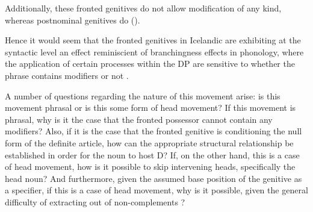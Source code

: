 \documentclass[output=paper]{langscibook}
\begin{document}
Additionally, these fronted genitives do not allow modification of any kind, whereas postnominal genitives do (\citealt{Magnusson:1984ue, OConnor:2013wz}). 

\begin{exe}
	\ex	\citet[101]{Magnusson:1984ue} \label{hardarsoncommons}\vspace{-0.75\baselineskip}
		\begin{xlist}
		\setlength{\columnsep}{-40pt}
		\begin{multicols}{2}
			 \columnbreak
		\end{multicols}
		\end{xlist}
\end{exe}

\noindent Hence it would seem that the fronted genitives in Icelandic are exhibiting at the syntactic level an effect reminiscient of branchingness effects in phonology, where the application of certain processes within the DP are sensitive to whether the phrase contains modifiers or not \citep[for an overview, see, e.g.,][]{Selkirk:2011wv,bonet2019}.

A number of questions regarding the nature of this movement arise: is this movement phrasal or is this some form of head movement? If this movement is phrasal, why is it the case that the fronted possessor cannot contain any modifiers? Also, if it is the case that the fronted genitive is conditioning the null form of the definite article, how can the appropriate structural relationship be established in order for the noun to host D? If, on the other hand, this is a case of head movement, how is it possible to skip intervening heads, specifically the head noun? And furthermore, given the assumed base position of the genitive as a specifier, if this is a case of head movement, why is it possible, given the general difficulty of extracting out of non-complements \citep[see, e.g.,][]{huang1982}?
\end{document}
